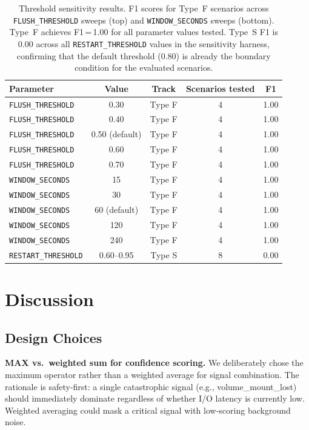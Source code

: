 \documentclass[runningheads]{llncs}
\begin{document}
\begin{table}[t]
\centering
\caption{Threshold sensitivity results.  F1 scores for Type~F scenarios
across \texttt{FLUSH\_THRESHOLD} sweeps (top) and
\texttt{WINDOW\_SECONDS} sweeps (bottom).
Type~F achieves F1\,=\,1.00 for all parameter values tested.
Type~S F1 is 0.00 across all \texttt{RESTART\_THRESHOLD} values in
the sensitivity harness, confirming that the default threshold
(0.80) is already the boundary condition for the evaluated scenarios.}
\label{fig:sensitivity}
\begin{tabular}{lcccc}
\toprule
\textbf{Parameter} & \textbf{Value} & \textbf{Track} &
  \textbf{Scenarios tested} & \textbf{F1} \\
\midrule
\texttt{FLUSH\_THRESHOLD} & 0.30 & Type F & 4 & 1.00 \\
\texttt{FLUSH\_THRESHOLD} & 0.40 & Type F & 4 & 1.00 \\
\texttt{FLUSH\_THRESHOLD} & 0.50 (default) & Type F & 4 & 1.00 \\
\texttt{FLUSH\_THRESHOLD} & 0.60 & Type F & 4 & 1.00 \\
\texttt{FLUSH\_THRESHOLD} & 0.70 & Type F & 4 & 1.00 \\
\midrule
\texttt{WINDOW\_SECONDS}  & 15 & Type F & 4 & 1.00 \\
\texttt{WINDOW\_SECONDS}  & 30 & Type F & 4 & 1.00 \\
\texttt{WINDOW\_SECONDS}  & 60 (default) & Type F & 4 & 1.00 \\
\texttt{WINDOW\_SECONDS}  & 120 & Type F & 4 & 1.00 \\
\texttt{WINDOW\_SECONDS}  & 240 & Type F & 4 & 1.00 \\
\midrule
\texttt{RESTART\_THRESHOLD} & 0.60--0.95 & Type S & 8 & 0.00 \\
\bottomrule
\end{tabular}
\end{table}

\section{Discussion}
\label{sec:discussion}

\subsection{Design Choices}

\noindent\textbf{MAX vs.\ weighted sum for confidence scoring.}
We deliberately chose the maximum operator rather than a weighted
average for signal combination.  The rationale is safety-first: a
single catastrophic signal (e.g., volume\_mount\_lost) should
immediately dominate regardless of whether I/O latency is currently low.
Weighted averaging could mask a critical signal with low-scoring
background noise.
\end{document}
